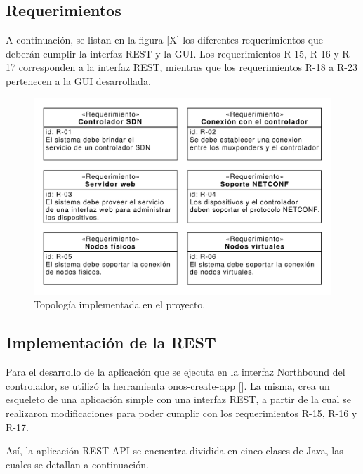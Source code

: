   \subsection{Requerimientos}

  A continuación, se listan en la figura [X] los diferentes requerimientos que deberán cumplir la interfaz REST y la GUI. Los requerimientos R-15, R-16 y R-17 corresponden a la interfaz REST, mientras que los requerimientos R-18 a R-23 pertenecen a la GUI desarrollada.  

  \begin{figure}[H]
    \centering
    \includegraphics[scale=0.65]{Figures/req_sys.pdf}
    \caption{Topología implementada en el proyecto.}
    \label{fig:req_sys}
  \end{figure}



  \subsection{ Implementación de la REST}

  Para el desarrollo de la aplicación que se ejecuta en la interfaz Northbound del controlador, se utilizó la herramienta onos-create-app []. La misma, crea un esqueleto de una aplicación simple con una interfaz REST, a partir de la cual se realizaron modificaciones para poder cumplir con los requerimientos R-15, R-16 y R-17.

  Así, la aplicación REST API se encuentra dividida en cinco clases de Java, las cuales se detallan a continuación. 


